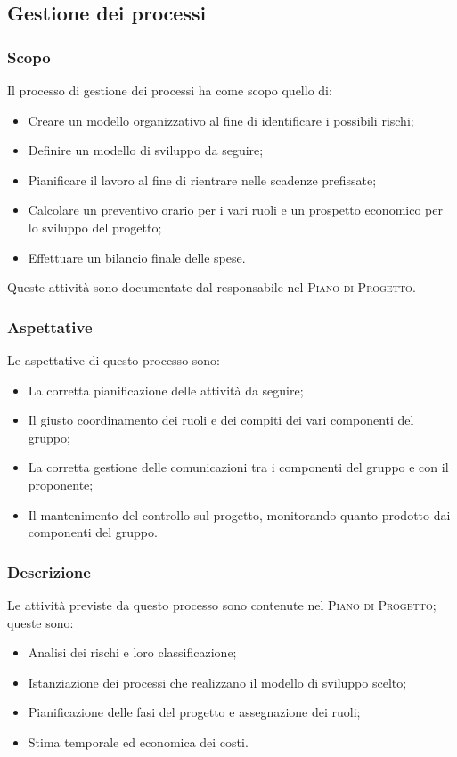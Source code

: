 \documentclass[../norme-di-progetto.tex]{subfiles}
\begin{document}
\subsection{Gestione dei processi}
\subsubsection{Scopo}
Il processo di gestione dei processi ha come scopo quello di:
\begin{itemize}
  \item Creare un modello organizzativo al fine di identificare i possibili rischi;
  \item Definire un modello di sviluppo da seguire;
  \item Pianificare il lavoro al fine di rientrare nelle scadenze prefissate;
  \item Calcolare un preventivo orario per i vari ruoli e un prospetto economico per lo sviluppo del progetto;
  \item Effettuare un bilancio finale delle spese.
\end{itemize}
Queste attività sono documentate dal responsabile nel \textsc{Piano di Progetto}.

\subsubsection{Aspettative}
Le aspettative di questo processo sono:
\begin{itemize}
  \item La corretta pianificazione delle attività da seguire;
  \item Il giusto coordinamento dei ruoli e dei compiti dei vari componenti del gruppo;
  \item La corretta gestione delle comunicazioni tra i componenti del gruppo e con il proponente;
  \item Il mantenimento del controllo sul progetto, monitorando quanto prodotto dai componenti del gruppo.
\end{itemize}

\subsubsection{Descrizione}
Le attività previste da questo processo sono contenute nel \textsc{Piano di Progetto}; queste sono:
\begin{itemize}
  \item Analisi dei rischi e loro classificazione;
  \item Istanziazione dei processi che realizzano il modello di sviluppo scelto;
  \item Pianificazione delle fasi del progetto e assegnazione dei ruoli;
  \item Stima temporale ed economica dei costi.
\end{itemize}
\end{document}
